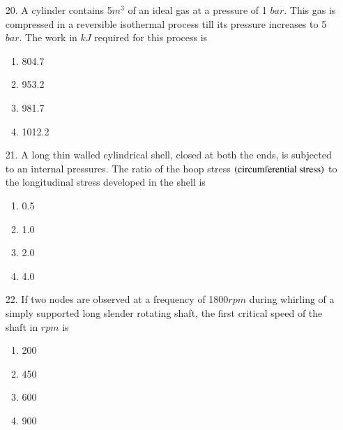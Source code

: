 \documentclass[journal,12pt,onecolumn]{IEEEtran}
\theoremstyle{remark}
\begin{document}
\begin{enumerate}
    \item[20.] A cylinder contains 5$m^3$ of an ideal gas at a pressure of 1 $bar$. This gas is
        compressed in a reversible isothermal process till its pressure increases to 5 $bar$. The
        work in $kJ$ required for this process is
        \hfill{}
        \begin{multicols}{4}
            \begin{enumerate}
                \item 804.7 \columnbreak
                \item 953.2 \columnbreak
                \item 981.7 \columnbreak
                \item 1012.2
            \end{enumerate}
        \end{multicols}

    \item[21.] A long thin walled cylindrical shell, closed at both the ends, is subjected to an 
        internal pressures. The ratio of the hoop stress $\left(\textnormal{circumferential stress}\right)$
        to the longitudinal stress developed in the shell is
        \hfill{}
        \begin{multicols}{4}
            \begin{enumerate}
                \item 0.5 \columnbreak
                \item 1.0 \columnbreak
                \item 2.0 \columnbreak
                \item 4.0
            \end{enumerate}
        \end{multicols}

    \item[22.] If two nodes are observed at a frequency of  1800$rpm$ during whirling of a simply
        supported long slender rotating shaft, the first critical speed of the shaft in $rpm$ is
        \hfill{}
        \begin{multicols}{4}
            \begin{enumerate}
                \item 200\columnbreak
                \item 450 \columnbreak
                \item 600 \columnbreak
                \item 900
            \end{enumerate}
        \end{multicols}


\end{enumerate}
\end{document}

